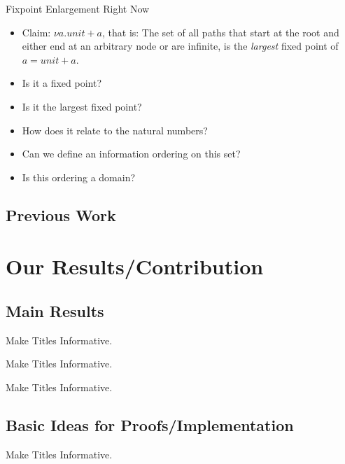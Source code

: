 \documentclass{beamer}
\begin{document}
\begin{frame}{Fixpoint Enlargement Right Now}

  \begin{itemize}
    \item Claim: $\nu a . unit + a$, that is: The set of all paths that start
          at the root and either end at an arbitrary node or are infinite, is
          the \emph{largest} fixed point of $a = unit + a$.
    \item Is it a fixed point?
    \item Is it the largest fixed point?
    \item How does it relate to the natural numbers?
    \item Can we define an information ordering on this set?
    \item Is this ordering a domain?
  \end{itemize}

\end{frame}

\subsection{Previous Work}




\section{Our Results/Contribution}

\subsection{Main Results}

\begin{frame}{Make Titles Informative.}
\end{frame}

\begin{frame}{Make Titles Informative.}
\end{frame}

\begin{frame}{Make Titles Informative.}
\end{frame}


\subsection{Basic Ideas for Proofs/Implementation}

\begin{frame}{Make Titles Informative.}
\end{frame}
\end{document}
